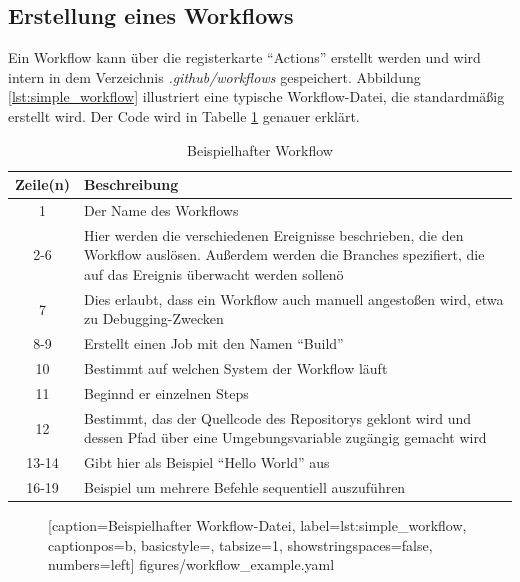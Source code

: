 \subsection{Erstellung eines Workflows}
Ein Workflow kann über die registerkarte \enquote{Actions} erstellt werden und wird intern in dem Verzeichnis \textit{.github/workflows} gespeichert. Abbildung \ref{lst:simple_workflow} illustriert eine typische Workflow-Datei, die standardmäßig erstellt wird. Der Code wird in Tabelle \ref{tab:descr_example_workflow} genauer erklärt.
\clearpage
\begin{table}[h!]
    \centering
    \begin{tabular}{c|m{10cm}}
        Zeile(n) &  Beschreibung \\\hline
         1 & Der Name des Workflows\\\hline
         2-6 & Hier werden die verschiedenen Ereignisse beschrieben, die den Workflow auslösen. Außerdem werden die Branches spezifiert, die auf das Ereignis überwacht werden sollenö\\\hline
         7 &  Dies erlaubt, dass ein Workflow auch manuell angestoßen wird, etwa zu Debugging-Zwecken\\\hline
         8-9 & Erstellt einen Job mit den Namen \enquote{Build}\\\hline
         10 & Bestimmt auf welchen System der Workflow läuft\\\hline
         11 & Beginnd er einzelnen Steps\\\hline
         12 & Bestimmt, das der Quellcode des Repositorys geklont wird und dessen Pfad über eine Umgebungsvariable zugängig gemacht wird\\\hline
         13-14 & Gibt hier als Beispiel \enquote{Hello World} aus\\\hline
         16-19 &Beispiel um mehrere Befehle sequentiell auszuführen\\\hline
         
    \end{tabular}
    \caption{Beispielhafter Workflow}
    \label{tab:descr_example_workflow}
\end{table}
		\begin{figure}[h!]
			
			[caption={Beispielhafter Workflow-Datei},
			label={lst:simple_workflow},
			captionpos=b, basicstyle=\footnotesize, tabsize=1, showstringspaces=false,  numbers=left]
			{figures/workflow_example.yaml}
		\end{figure}
	\clearpage
